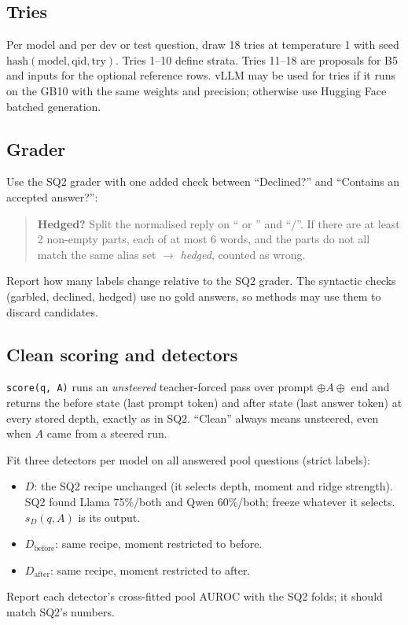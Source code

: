 \documentclass[11pt]{article}
\newcommand{\sD}{s_{D}}
\begin{document}
\subsection{Tries}
Per model and per dev or test question, draw 18 tries at temperature 1 with seed
$\mathrm{hash}(\text{model}, \text{qid}, \text{try})$. Tries 1--10 define strata. Tries 11--18 are
proposals for B5 and inputs for the optional reference rows. vLLM may be used for tries if it runs on the GB10
with the same weights and precision; otherwise use Hugging Face batched generation.

\subsection{Grader}\label{sec:grader}
Use the SQ2 grader with one added check between ``Declined?'' and ``Contains an accepted answer?'':
\begin{quote}
\textbf{Hedged?} Split the normalised reply on `` or '' and ``/''. If there are at least 2 non-empty parts,
each of at most 6 words, and the parts do not all match the same alias set $\rightarrow$ \emph{hedged},
counted as wrong.
\end{quote}
Report how many labels change relative to the SQ2 grader. The syntactic checks (garbled, declined, hedged)
use no gold answers, so methods may use them to discard candidates.

\subsection{Clean scoring and detectors}
\texttt{score(q, A)} runs an \emph{unsteered} teacher-forced pass over prompt $\oplus A \oplus$ end and
returns the before state (last prompt token) and after state (last answer token) at every stored depth, exactly
as in SQ2. ``Clean'' always means unsteered, even when $A$ came from a steered run.

Fit three detectors per model on all answered pool questions (strict labels):
\begin{itemize}
  \item $D$: the SQ2 recipe unchanged (it selects depth, moment and ridge strength). SQ2 found Llama
        75\%/both and Qwen 60\%/both; freeze whatever it selects. $\sD(q, A)$ is its output.
  \item $D_{\mathrm{before}}$: same recipe, moment restricted to before.
  \item $D_{\mathrm{after}}$: same recipe, moment restricted to after.
\end{itemize}
Report each detector's cross-fitted pool AUROC with the SQ2 folds; it should match SQ2's numbers.
\end{document}
